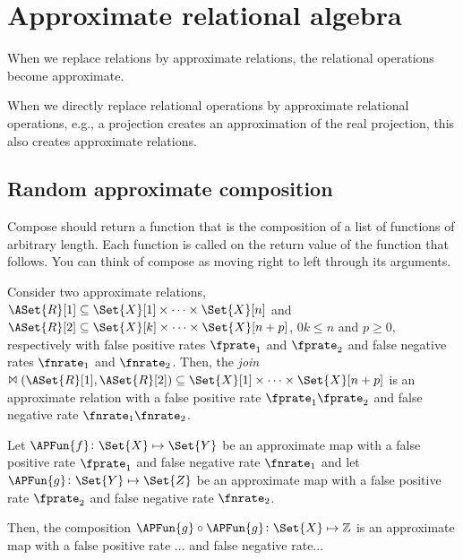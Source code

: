 \documentclass[ ../main.tex]{subfiles}
\begin{document}
\section{Approximate relational algebra}
When we replace relations by approximate relations, the relational operations become approximate.

When we directly replace relational operations by approximate relational operations, e.g., a projection creates an approximation of the real projection, this also creates approximate relations.

\subsection{Random approximate composition}
Compose should return a function that is the composition of a list of functions of arbitrary length. Each function is called on the return value of the function that follows. You can think of compose as moving right to left through its arguments.


\begin{theorem}[Composition]
	Consider two approximate relations, $\ASet{R}[1] \subseteq \Set{X}[1] \times \cdots \times \Set{X}[n]$ and $\ASet{R}[2] \subseteq \Set{X}[k] \times \cdots \times \Set{X}[n+p]$, $0 k \leq n$ and $p \geq 0$, respectively with false positive rates $\fprate_1$ and $\fprate_2$ and false negative rates $\fnrate_1$ and $\fnrate_2$. Then, the \emph{join} $\Join(\ASet{R}[1],\ASet{R}[2]) \subseteq \Set{X}[1] \times \cdots \times \Set{X}[n+p]$ is an approximate relation with a false positive rate $\fprate_1 \fprate_2$ and false negative rate $\fnrate_1 \fnrate_2$.
\end{theorem}
\begin{example}
	Let $\APFun{f} \colon \Set{X} \mapsto \Set{Y}$ be an approximate map with a false positive rate $\fprate_1$ and false negative rate $\fnrate_1$ and let $\APFun{g} \colon \Set{Y} \mapsto \Set{Z}$ be an approximate map with a false positive rate $\fprate_2$ and false negative rate $\fnrate_2$.
	
	Then, the composition $\APFun{g} \circ \APFun{g} \colon \Set{X} \mapsto \mathbb{Z}$ is an approximate map with a false positive rate ... and false negative rate...
\end{example}
\end{document}
